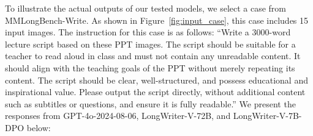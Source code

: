 To illustrate the actual outputs of our tested models, we select a case from MMLongBench-Write. As shown in Figure~\ref{fig:input_case}, this case includes 15 input images. The instruction for this case is as follows:
``Write a 3000-word lecture script based on these PPT images. The script should be suitable for a teacher to read aloud in class and must not contain any unreadable content. It should align with the teaching goals of the PPT without merely repeating its content. The script should be clear, well-structured, and possess educational and inspirational value. Please output the script directly, without additional content such as subtitles or questions, and ensure it is fully readable.''
We present the responses from GPT-4o-2024-08-06, LongWriter-V-72B, and LongWriter-V-7B-DPO below:

\noindent
\textbf{}

